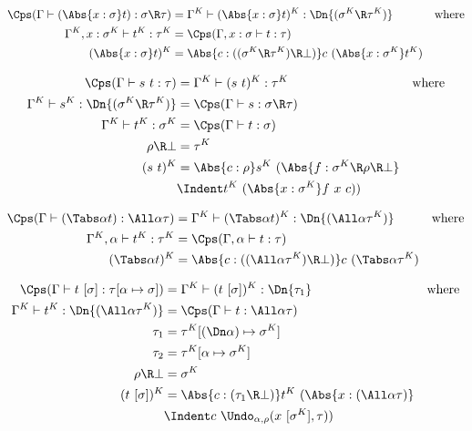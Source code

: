 \documentclass{amsart}
\begin{document}
\begin{align*}
\Cps(\Gamma \vdash (\Abs{x:\sigma}t) : \sigma \R \tau) & =
  \Gamma^K \vdash (\Abs{x:\sigma}t)^K : \Dn{(\sigma^K \R \tau^K)} &
  \mbox{where}
  \\
\Gamma^K,x:\sigma^K \vdash t^K : \tau^K & =
  \Cps(\Gamma,x:\sigma \vdash t : \tau)
  \\
(\Abs{x:\sigma}t)^K & =
  \Abs{c : ((\sigma^K \R \tau^K) \R \bot)}c~(\Abs{x : \sigma^K} t^K)
\end{align*}

\begin{align*}
\Cps(\Gamma \vdash s~t : \tau) & =
  \Gamma^K \vdash (s~t)^K : \tau^K
  & \mbox{where}
  \\
\Gamma^K \vdash s^K : \Dn{(\sigma^K \R \tau^K)} & =
  \Cps(\Gamma \vdash s : \sigma \R \tau)
  \\
\Gamma^K \vdash t^K : \sigma^K & =
  \Cps(\Gamma \vdash t : \sigma)
  \\
\rho \R \bot & = \tau^K
  \\
(s~t)^K & =
  \Abs{c : \rho} s^K~(\Abs{f : \sigma^K \R \rho \R \bot} \\
  &\Indent t^K~(\Abs{x : \sigma^K} f~x~c))
\end{align*}

\begin{align*}
\Cps(\Gamma \vdash (\Tabs\alpha t) : \All\alpha \tau) & =
  \Gamma^K \vdash (\Tabs\alpha t)^K : \Dn{(\All\alpha \tau^K)}
  & \mbox{where}
  \\
\Gamma^K,\alpha \vdash t^K : \tau^K & =
  \Cps(\Gamma,\alpha \vdash t : \tau)
  \\
(\Tabs\alpha t)^K & =
  \Abs{c : ((\All\alpha \tau^K) \R \bot)}c~(\Tabs\alpha \tau^K)
\end{align*}

\begin{align*}
\Cps(\Gamma \vdash t~[\sigma] : \tau[\alpha\mapsto\sigma]) & =
  \Gamma^K \vdash (t~[\sigma])^K :
  \Dn{\tau_1}
  & \mbox{where}
  \\
\Gamma^K \vdash t^K : \Dn{(\All\alpha \tau^K)} & =
  \Cps(\Gamma \vdash t : \All\alpha \tau)
  \\
\tau_1 & = \tau^K[(\Dn\alpha) \mapsto \sigma^K]
  \\
\tau_2 & = \tau^K[\alpha \mapsto \sigma^K]
  \\
\rho \R \bot & = \sigma^K
  \\
 (t~[\sigma])^K & =
  \Abs{c : (\tau_1 \R \bot)} t^K~(\Abs{x : (\All\alpha\tau)} \\
  &\Indent
  c~\Undo_{\alpha,\rho}(x~[\sigma^K], \tau))
\end{align*}
\end{document}
